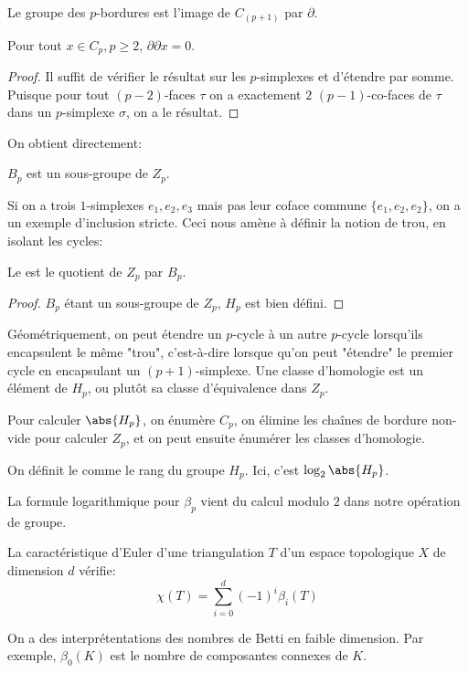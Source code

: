 \begin{definition}
	Le groupe  des $p$-bordures est l'image de $C_{(p + 1)}$ par $\partial$.
\end{definition}

\begin{lemme}
	Pour tout $x \in C_{p}, p \geq 2$, $\partial \partial x = 0$.
\end{lemme}
\begin{proof}
	Il suffit de vérifier le résultat sur les $p$-simplexes et d'étendre par somme.
	Puisque pour tout $(p-2)$-faces $\tau$ on a exactement $2$ $(p-1)$-co-faces de $\tau$ dans un $p$-simplexe $\sigma$, on a le résultat.
\end{proof}

On obtient directement:
\begin{proposition}
	$B_{p}$ est un sous-groupe de $Z_{p}$.
\end{proposition}
Si on a trois $1$-simplexes $e_{1}, e_{2}, e_{3}$ mais pas leur coface commune $\{e_{1}, e_{2}, e_{2}\}$, on a un exemple d'inclusion stricte.
Ceci nous amène à définir la notion de trou, en isolant les cycles:

\begin{definition}
	Le  est le quotient de $Z_{p}$ par $B_{p}$.
\end{definition}
\begin{proof}
	$B_{p}$ étant un sous-groupe de $Z_{p}$, $H_{p}$ est bien défini.
\end{proof}

Géométriquement, on peut étendre un $p$-cycle à un autre $p$-cycle lorsqu'ils encapsulent le même "trou", c'est-à-dire lorsque qu'on peut "étendre" le premier cycle en encapsulant un $(p + 1)$-simplexe.
Une classe d'homologie est un élément de $H_{p}$, ou plutôt sa classe d'équivalence dans $Z_{p}$.

Pour calculer $\abs{H_{p}}$, on énumère $C_{p}$, on élimine les chaînes de bordure non-vide pour calculer $Z_{p}$, et on peut ensuite énumérer les classes d'homologie.

\begin{definition}
	On définit le  comme le rang du groupe $H_{p}$. Ici, c'est $\log_{2}\abs{H_{p}}$.
\end{definition}
La formule logarithmique pour $\beta_{p}$ vient du calcul modulo $2$ dans notre opération de groupe.

\begin{proposition}
	La caractéristique d'Euler d'une triangulation $T$ d'un espace topologique $X$ de dimension $d$ vérifie:
	\begin{equation*}
		\chi(T) = \sum_{i = 0}^{d} (-1)^{i}\beta_{i}(T)
	\end{equation*}
\end{proposition}

On a des interprétentations des nombres de Betti en faible dimension.
Par exemple, $\beta_{0}(K)$ est le nombre de composantes connexes de $K$.


